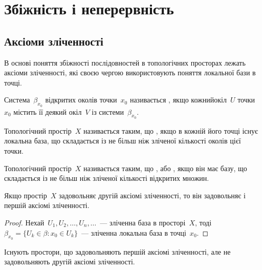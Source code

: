\chapter{Збіжність і неперервність}

\section{Аксіоми зліченності}

В основі поняття збіжності послідовностей в топологічних просторах лежать аксіоми зліченності, які своєю чергою використовують поняття локальної бази в точці.

\begin{definition}
    Система~$\beta_{x_0}$ відкритих околів точки~$x_0$ називається , якщо кожнийокіл~$U$ точки~$x_0$ містить її деякий окіл~$V$ із системи~$\beta_{x_0}$.
\end{definition}

\begin{definition}
    Топологічний простір~$X$ називається таким, що , якщо в кожній його точці існує локальна база, що складається із не більш ніж зліченої кількості околів цієї точки.
\end{definition}

\begin{definition}
    Топологічний простір~$X$ називається таким, що , або , якщо він має базу, що складається із не більш ніж зліченої кількості відкритих множин.
\end{definition}

\begin{lemma}
    Якщо простір~$X$ задовольняє другій аксіомі зліченності, то він задовольняє і першій аксіомі зліченності.
\end{lemma}

\begin{proof}
    Нехай~$U_1, U_2, \ldots, U_n, \ldots$~--- зліченна база в просторі~$X$, тоді~$\beta_{x_0} = \{ U_k \in \beta: x_0 \in U_k \}$~--- зліченна локальна база в точці~$x_0$.
\end{proof}

\begin{lemma}
    Існують простори, що задовольняють першій аксіомі зліченності, але не задовольняють другій аксіомі зліченності.
\end{lemma}

